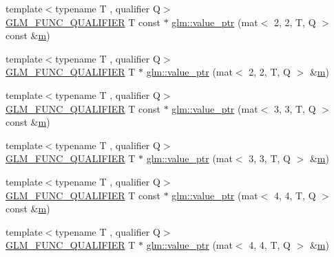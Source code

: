 \begin{DoxyCompactItemize}
\item 
{\footnotesize template$<$typename T , qualifier Q$>$ }\\\mbox{\hyperlink{setup_8hpp_a33fdea6f91c5f834105f7415e2a64407}{G\+L\+M\+\_\+\+F\+U\+N\+C\+\_\+\+Q\+U\+A\+L\+I\+F\+I\+ER}} T const  $\ast$ \mbox{\hyperlink{group__gtc__type__ptr_ga6144a4839923074f038b63506b855faf}{glm\+::value\+\_\+ptr}} (mat$<$ 2, 2, T, Q $>$ const \&\mbox{\hyperlink{_s_d_l__opengl__glext_8h_af593500c283bf1a787a6f947f503a5c2}{m}})
\item 
{\footnotesize template$<$typename T , qualifier Q$>$ }\\\mbox{\hyperlink{setup_8hpp_a33fdea6f91c5f834105f7415e2a64407}{G\+L\+M\+\_\+\+F\+U\+N\+C\+\_\+\+Q\+U\+A\+L\+I\+F\+I\+ER}} T $\ast$ \mbox{\hyperlink{group__gtc__type__ptr_gac636dcc35b194f5e950a3d0fb9ef44ef}{glm\+::value\+\_\+ptr}} (mat$<$ 2, 2, T, Q $>$ \&\mbox{\hyperlink{_s_d_l__opengl__glext_8h_af593500c283bf1a787a6f947f503a5c2}{m}})
\item 
{\footnotesize template$<$typename T , qualifier Q$>$ }\\\mbox{\hyperlink{setup_8hpp_a33fdea6f91c5f834105f7415e2a64407}{G\+L\+M\+\_\+\+F\+U\+N\+C\+\_\+\+Q\+U\+A\+L\+I\+F\+I\+ER}} T const  $\ast$ \mbox{\hyperlink{group__gtc__type__ptr_gad80f09b66c6f11043ea79e506d141594}{glm\+::value\+\_\+ptr}} (mat$<$ 3, 3, T, Q $>$ const \&\mbox{\hyperlink{_s_d_l__opengl__glext_8h_af593500c283bf1a787a6f947f503a5c2}{m}})
\item 
{\footnotesize template$<$typename T , qualifier Q$>$ }\\\mbox{\hyperlink{setup_8hpp_a33fdea6f91c5f834105f7415e2a64407}{G\+L\+M\+\_\+\+F\+U\+N\+C\+\_\+\+Q\+U\+A\+L\+I\+F\+I\+ER}} T $\ast$ \mbox{\hyperlink{group__gtc__type__ptr_ga7bafdd942876d208a5fc34faa4518c36}{glm\+::value\+\_\+ptr}} (mat$<$ 3, 3, T, Q $>$ \&\mbox{\hyperlink{_s_d_l__opengl__glext_8h_af593500c283bf1a787a6f947f503a5c2}{m}})
\item 
{\footnotesize template$<$typename T , qualifier Q$>$ }\\\mbox{\hyperlink{setup_8hpp_a33fdea6f91c5f834105f7415e2a64407}{G\+L\+M\+\_\+\+F\+U\+N\+C\+\_\+\+Q\+U\+A\+L\+I\+F\+I\+ER}} T const  $\ast$ \mbox{\hyperlink{group__gtc__type__ptr_ga72565b63af29f056843ecd4956b3c738}{glm\+::value\+\_\+ptr}} (mat$<$ 4, 4, T, Q $>$ const \&\mbox{\hyperlink{_s_d_l__opengl__glext_8h_af593500c283bf1a787a6f947f503a5c2}{m}})
\item 
{\footnotesize template$<$typename T , qualifier Q$>$ }\\\mbox{\hyperlink{setup_8hpp_a33fdea6f91c5f834105f7415e2a64407}{G\+L\+M\+\_\+\+F\+U\+N\+C\+\_\+\+Q\+U\+A\+L\+I\+F\+I\+ER}} T $\ast$ \mbox{\hyperlink{group__gtc__type__ptr_ga68a08cd646559275950123dfffbdaf55}{glm\+::value\+\_\+ptr}} (mat$<$ 4, 4, T, Q $>$ \&\mbox{\hyperlink{_s_d_l__opengl__glext_8h_af593500c283bf1a787a6f947f503a5c2}{m}})

\end{DoxyCompactItemize}
